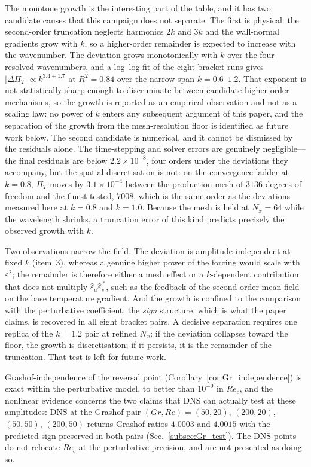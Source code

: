\documentclass[12pt,a4paper]{article}
\newcommand{\Rey}{\mathit{Re}}
\newcommand{\Grr}{\mathit{Gr}}
\newcommand{\PiT}{\Pi_T}
\begin{document}
The monotone growth is the interesting part of the table, and it has two
candidate causes that this campaign does not separate. The first is physical:
the second-order truncation neglects harmonics $2k$ and $3k$ and the wall-normal
gradients grow with $k$, so a higher-order remainder is expected to increase
with the wavenumber. The deviation grows monotonically with $k$ over the four
resolved wavenumbers, and a log--log fit of the eight bracket runs gives
$|\Delta\PiT|\propto k^{3.4\pm1.7}$ at $R^2=0.84$ over the narrow span
$k=0.6$--$1.2$. That exponent is not statistically sharp enough to discriminate
between candidate higher-order mechanisms, so the growth is reported as an
empirical observation and not as a scaling law: no power of $k$ enters any
subsequent argument of this paper, and the separation of the growth from the
mesh-resolution floor is identified as future work below.
The second candidate is numerical, and it cannot be dismissed by the residuals
alone. The time-stepping and solver errors are genuinely negligible---the final
residuals are below $2.2\times10^{-8}$, four orders under the deviations they
accompany, but the spatial discretisation is not: on the convergence
ladder at $k=0.8$, $\PiT$ moves by $3.1\times10^{-4}$ between the production
mesh of $3136$ degrees of freedom and the finest tested, $7008$, which is the
same order as the deviations measured here at $k=0.8$ and $k=1.0$. Because the
mesh is held at $N_x=64$ while the wavelength shrinks, a truncation error of
this kind predicts precisely the observed growth with $k$.

Two observations narrow the field. The deviation is amplitude-independent at
fixed $k$ (item~3), whereas a genuine higher power of the forcing would scale
with $\varepsilon^2$; the remainder is therefore either a mesh effect or a
$k$-dependent contribution that does not multiply $\widehat\varepsilon_a
\widehat\varepsilon_s^{\,*}$, such as the feedback of the second-order mean
field on the base temperature gradient. And the growth is confined to the
comparison with the perturbative coefficient: the \emph{sign} structure, which
is what the paper claims, is recovered in all eight bracket pairs. A decisive
separation requires one replica of the $k=1.2$ pair at refined $N_x$: if the
deviation collapses toward the floor, the growth is discretisation; if it
persists, it is the remainder of the truncation. That test is left for future work.

Grashof-independence of the reversal point (Corollary~\ref{cor:Gr_independence})
is exact within the perturbative model, to better than $10^{-9}$ in $\Rey_c$, and the
nonlinear evidence concerns the two claims that DNS can actually test at these
amplitudes: DNS at the Grashof pair
$(\Grr,\Rey)=(50,20)$, $(200,20)$, $(50,50)$, $(200,50)$ returns Grashof ratios
$4.0003$ and $4.0015$ with the predicted sign preserved in both pairs
(Sec.~\ref{subsec:Gr_test}). The DNS points do not relocate $\Rey_c$ at the
perturbative precision, and are not presented as doing so.
\end{document}
